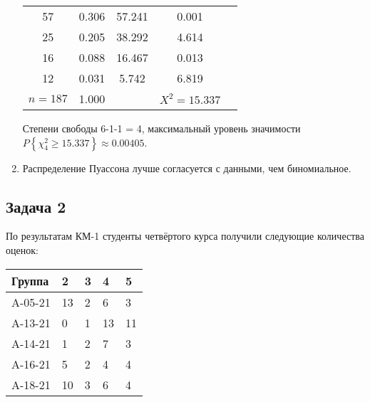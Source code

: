 \documentclass[a4paper,12pt]{article}
\newcommand{\probability}[1]{P \left\{ #1 \right\}}
\begin{document}
\begin{enumerate}
\begin{tabular}{|c|c|c|c|c|}
                  57        & 0.306           & 57.241            & 0.001                                               \\
                  25        & 0.205           & 38.292            & 4.614                                               \\
                  16        & 0.088           & 16.467            & 0.013                                               \\
                  12        & 0.031           & 5.742             & 6.819                                               \\
                  \hline
                  $n = 187$ & 1.000           &                   & $X^2 = 15.337$                                      \\
                  \hline
              \end{tabular}

              Степени свободы 6-1-1 = 4, максимальный уровень значимости $\probability{\chi_4^2 \ge 15.337} \approx 0.00405$.

              \item Распределение Пуассона лучше согласуется с данными, чем биномиальное.
    \end{enumerate}
\fi

\subsection*{Задача 2}

По результатам КМ-1 студенты четвёртого курса получили следующие количества оценок:

\begin{center}
    \begin{tabular}{|P{2cm}|P{1cm}|P{1cm}|P{1cm}|P{1cm}|}
        \hline
        Группа  & 2  & 3 & 4  & 5  \\
        \hline
        A-05-21 & 13 & 2 & 6  & 3  \\
        \hline
        A-13-21 & 0  & 1 & 13 & 11 \\
        \hline
        A-14-21 & 1  & 2 & 7  & 3  \\
        \hline
        A-16-21 & 5  & 2 & 4  & 4  \\
        \hline
        A-18-21 & 10 & 3 & 6  & 4  \\
        \hline
    \end{tabular}
\end{center}
\end{document}
